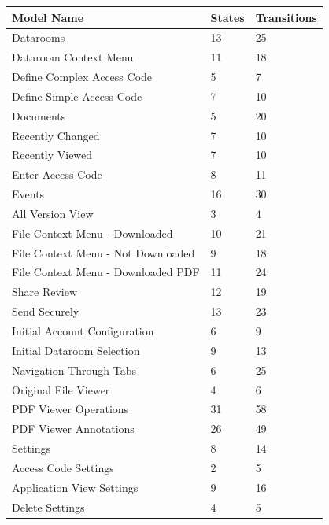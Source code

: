 \begin{table}[]
    \centering
    \begin{tabular}{|l|l|l|}
        \hline
        \textbf{Model Name} & \textbf{States} & \textbf{Transitions} \\
        \hline
        Datarooms & 13 & 25 \\
        \hline
        Dataroom Context Menu & 11 & 18 \\
        \hline
        Define Complex Access Code & 5 & 7 \\
        \hline
        Define Simple Access Code & 7 & 10 \\
        \hline
        Documents & 5 & 20 \\
        \hline
        Recently Changed & 7 & 10 \\
        \hline
        Recently Viewed & 7 & 10 \\
        \hline
        Enter Access Code & 8 & 11 \\
        \hline
        Events & 16 & 30 \\
        \hline
        All Version View & 3 & 4 \\
        \hline
        File Context Menu - Downloaded & 10 & 21 \\
        \hline
        File Context Menu - Not Downloaded & 9 & 18 \\
        \hline
        File Context Menu - Downloaded PDF & 11 & 24 \\
        \hline
        Share Review & 12 & 19 \\
        \hline
        Send Securely & 13 & 23 \\
        \hline
        Initial Account Configuration & 6 & 9 \\
        \hline
        Initial Dataroom Selection & 9 & 13 \\
        \hline
        Navigation Through Tabs & 6 & 25 \\
        \hline
        Original File Viewer & 4 & 6 \\
        \hline
        PDF Viewer Operations & 31 & 58 \\
        \hline
        PDF Viewer Annotations & 26 & 49 \\
        \hline
        Settings & 8 & 14 \\
        \hline
        Access Code Settings & 2 & 5 \\
        \hline
        Application View Settings & 9 & 16 \\
        \hline
        Delete Settings & 4 & 5 \\

\end{tabular}
\end{table}
